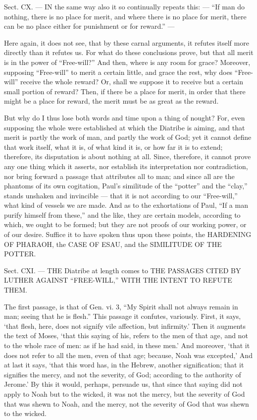 
Sect. CX. — IN the same way also it so continually repeats this: — “If man do nothing, there is no place for merit, and where there is no place for merit, there can be no place either for punishment or for reward.” —

Here again, it does not see, that by these carnal arguments, it refutes itself more directly than it refutes us. For what do these conclusions prove, but that all merit is in the power of “Free-will?” And then, where is any room for grace? Moreover, supposing “Free-will” to merit a certain little, and grace the rest, why does “Free-will” receive the whole reward? Or, shall we suppose it to receive but a certain small portion of reward? Then, if there be a place for merit, in order that there might be a place for reward, the merit must be as great as the reward.

But why do I thus lose both words and time upon a thing of nought? For, even supposing the whole were established at which the Diatribe is aiming, and that merit is partly the work of man, and partly the work of God; yet it cannot define that work itself, what it is, of what kind it is, or how far it is to extend; therefore, its disputation is about nothing at all. Since, therefore, it cannot prove any one thing which it asserts, nor establish its interpretation nor contradiction, nor bring forward a passage that attributes all to man; and since all are the phantoms of its own cogitation, Paul’s similitude of the “potter” and the “clay,” stands unshaken and invincible — that it is not according to our “Free-will,” what kind of vessels we are made. And as to the exhortations of Paul, “If a man purify himself from these,” and the like, they are certain models, according to which, we ought to be formed; but they are not proofs of our working power, or of our desire. Suffice it to have spoken thus upon these points, the \textsc{HARDENING OF PHARAOH}, the \textsc{CASE OF ESAU}, and the \textsc{SIMILITUDE OF THE POTTER}.


Sect. CXI. — THE Diatribe at length comes to \textsc{THE PASSAGES CITED BY LUTHER AGAINST “FREE-WILL,” WITH THE INTENT TO REFUTE THEM}.

The first passage, is that of Gen. vi. 3, “My Spirit shall not always remain in man; seeing that he is flesh.” This passage it confutes, variously. First, it says, ‘that flesh, here, does not signify vile affection, but infirmity.’ Then it augments the text of Moses, ‘that this saying of his, refers to the men of that age, and not to the whole race of men: as if he had said, in these men.’ And moreover, ‘that it does not refer to all the men, even of that age; because, Noah was excepted,’ And at last it says, ‘that this word has, in the Hebrew, another signification; that it signifies the mercy, and not the severity, of God; according to the authority of Jerome.’ By this it would, perhaps, persuade us, that since that saying did not apply to Noah but to the wicked, it was not the mercy, but the severity of God that was shewn to Noah, and the mercy, not the severity of God that was shewn to the wicked.

